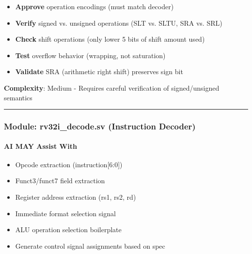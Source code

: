 \begin{record}

\begin{itemize}
\tightlist
\item
  \textbf{Approve} operation encodings (must match decoder)
\item
  \textbf{Verify} signed vs. unsigned operations (SLT vs. SLTU, SRA vs.
  SRL)
\item
  \textbf{Check} shift operations (only lower 5 bits of shift amount
  used)
\item
  \textbf{Test} overflow behavior (wrapping, not saturation)
\item
  \textbf{Validate} SRA (arithmetic right shift) preserves sign bit
\end{itemize}

\textbf{Complexity}: \partialmark{} Medium - Requires careful
verification of signed/\allowbreak{}unsigned semantics

\begin{center}\rule{0.5\linewidth}{0.5pt}\end{center}

\end{record}

\subsubsection{\texorpdfstring{Module: rv32i\_\allowbreak{}decode.sv
(Instruction Decoder)}{Module: rv32i\_decode.sv (Instruction Decoder)}}\label{cr:status:phase1-ai-human-responsibilities:module-rv32i-decodesv-instruction-decoder}

\paragraph{\texorpdfstring{\ok{} AI MAY Assist
With}{ AI MAY Assist With}}\label{cr:status:phase1-ai-human-responsibilities:white-check-mark-ai-may-assist-with-3}

\begin{record}

\begin{itemize}
\tightlist
\item
  Opcode extraction (instruction{[}6:0{]})
\item
  Funct3/\allowbreak{}funct7 field extraction
\item
  Register address extraction (rs1, rs2, rd)
\item
  Immediate format selection signal
\item
  ALU operation selection boilerplate
\item
  Generate control signal assignments based on spec
\end{itemize}

\end{record}

